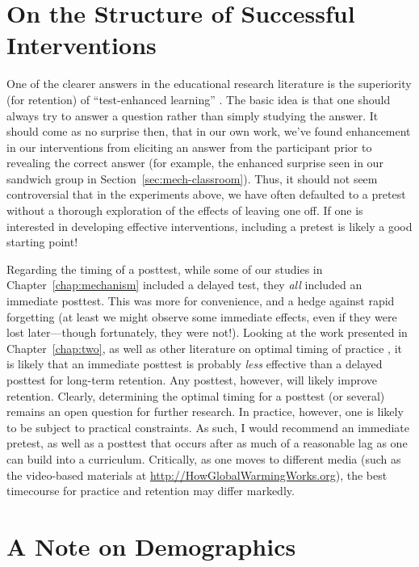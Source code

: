 \section{On the Structure of Successful Interventions}


One of the clearer answers in the educational research literature is the
superiority (for retention) of “test-enhanced learning”
\parencite{roediger_test-enhanced_2006}. The basic idea is that one should
always try to answer a question rather than simply studying the answer. It
should come as no surprise then, that in our own work, we've found enhancement
in our interventions from eliciting an answer from the participant prior to
revealing the correct answer (for example, the enhanced surprise seen in our
sandwich group in Section~\ref{sec:mech-classroom}). Thus, it should not seem
controversial that in the experiments above, we have often defaulted to a
pretest without a thorough exploration of the effects of leaving one off. If one
is interested in developing effective interventions, including a pretest is
likely a good starting point!

Regarding the timing of a posttest, while some of our studies in
Chapter~\ref{chap:mechanism} included a delayed test, they \emph{all} included
an immediate posttest. This was more for convenience, and a hedge against rapid
forgetting (at least we might observe some immediate effects, even if they were
lost later---though fortunately, they were not!). Looking at the work presented
in Chapter~\ref{chap:two}, as well as other literature on optimal timing of
practice \parencite[e.g.,][]{cepeda_optimizing_2009}, it is likely that an
immediate posttest is probably \emph{less} effective than a delayed posttest for
long-term retention. Any posttest, however, will likely improve retention.
Clearly, determining the optimal timing for a posttest (or several) remains an
open question for further research. In practice, however, one is likely to be
subject to practical constraints. As such, I would recommend an immediate
pretest, as well as a posttest that occurs after as much of a reasonable lag as
one can build into a curriculum. Critically, as one moves to different media
(such as the video-based materials at \url{http://HowGlobalWarmingWorks.org}),
the best timecourse for practice and retention may differ markedly.

\section{A Note on Demographics}

